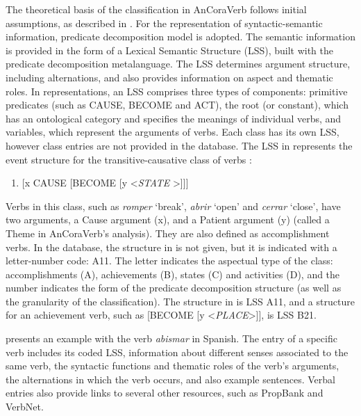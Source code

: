 \documentclass[english]{textolivre}
\begin{document}
The theoretical basis of the classification in AnCoraVerb follows  initial assumptions, as described in . For the representation of syntactic-semantic information,  predicate decomposition model is adopted. The semantic information is provided in the form of a Lexical Semantic Structure (LSS), built with the predicate decomposition metalanguage. The LSS determines argument structure, including alternations, and also provides information on aspect and thematic roles. In  representations, an LSS comprises three types of components: primitive predicates (such as CAUSE, BECOME and ACT), the root (or constant), which has an ontological category and specifies the meanings of individual verbs, and variables, which represent the arguments of verbs. Each class has its own LSS, however class entries are not provided in the database. The LSS in  represents the event structure for the transitive-causative class of verbs \cite[p.~265]{aparicio_ancora-verb:_2008}:

\begin{enumerate}[label=(\arabic*),resume]
\item \label{itm17}[x CAUSE [BECOME [y <\textit{STATE} >]]]
\end{enumerate}

Verbs in this class, such as \textit{romper} ‘break’, \textit{abrir} ‘open’ and \textit{cerrar} ‘close’, have two arguments, a Cause argument (x), and a Patient argument (y) (called a Theme in AnCoraVerb’s analysis). They are also defined as accomplishment verbs. In the database, the structure in  is not given, but it is indicated with a letter-number code: A11. The letter indicates the aspectual type of the class: accomplishments (A), achievements (B), states (C) and activities (D), and the number indicates the form of the predicate decomposition structure (as well as the granularity of the classification). The structure in  is LSS A11, and a structure for an achievement verb, such as [BECOME [y <\textit{PLACE}>]], is LSS B21.

 presents an example with the verb \textit{abismar} in Spanish. The entry of a specific verb includes its coded LSS, information about different senses associated to the same verb, the syntactic functions and thematic roles of the verb’s arguments, the alternations in which the verb occurs, and also example sentences. Verbal entries also provide links to several other resources, such as PropBank and VerbNet.
\end{document}
